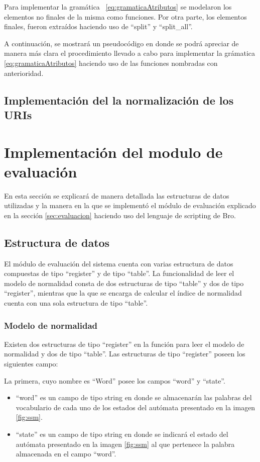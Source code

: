 Para implementar la gramática ~\ref{eq:gramaticaAtributos} se modelaron los elementos no finales de la misma como funciones. Por otra parte, los elementos finales, fueron extraídos haciendo uso de “split” y “split\_all”.

A continuación, se mostrará un pseudocódigo en donde se podrá apreciar de manera más clara el procedimiento llevado a cabo para implementar la grámatica \ref{eq:gramaticaAtributos} haciendo uso de las funciones nombradas con anterioridad.

\subsection{Implementación del la normalización de los URIs}\label{subsec:implementacionNorm}
        
\section{Implementación del modulo de evaluación}
En esta sección se explicará de manera detallada las estructuras de datos utilizadas y la manera en la que se implementó el módulo de evaluación explicado en la sección \ref{sec:evaluacion}  haciendo uso del lenguaje de scripting de Bro. 


\subsection{Estructura de datos}

El módulo de evaluación del sistema cuenta con varias estructura de datos compuestas de tipo “register” y de tipo “table”. La funcionalidad de leer el modelo de normalidad consta de dos estructuras de tipo “table” y dos de tipo “register”, mientras que la que se encarga de calcular el índice de normalidad cuenta con una sola estructura de tipo “table”.

\subsubsection{Modelo de normalidad}
\label{sssec:estructuraModelo}

Existen dos estructuras de tipo “register” en la función para leer el modelo de normalidad y dos de tipo “table”.
Las estructuras de tipo “register” poseen los siguientes campo:

La primera, cuyo nombre es “Word” posee los campos “word” y  “state”.

\begin{itemize}
\item “word” es un campo de tipo string en donde se almacenarán las palabras del vocabulario de cada uno de los estados del autómata presentado en la imagen \ref{fig:ssm}.
\item “state” es un campo de tipo string en donde se indicará el estado del autómata presentado en la imagen \ref{fig:ssm} al que pertenece la palabra almacenada en el campo “word”.
\end{itemize}

